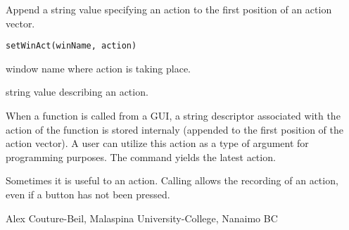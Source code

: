 \documentclass[letterpaper]{book}
\begin{document}
\begin{Description}\relax
Append a string value specifying an action to the first position of an 
action vector.
\end{Description}
\begin{Usage}
\begin{verbatim}
setWinAct(winName, action)
\end{verbatim}
\end{Usage}
\begin{Arguments}
\begin{ldescription}
\item[\code{winName}] window name where action is taking place.
\item[\code{action}] string value describing an action.
\end{ldescription}
\end{Arguments}
\begin{Details}\relax
When a function is called from a GUI, a string descriptor associated with 
the action of the function is stored internaly (appended to the first position 
of the action vector). A user can utilize this action as a type of argument 
for programming purposes. The command  yields the latest action.

Sometimes it is useful to  an action. Calling  allows 
the recording of an action, even if a button has not been pressed.
\end{Details}
\begin{Author}\relax
Alex Couture-Beil, Malaspina University-College, Nanaimo BC
\end{Author}
\end{document}
